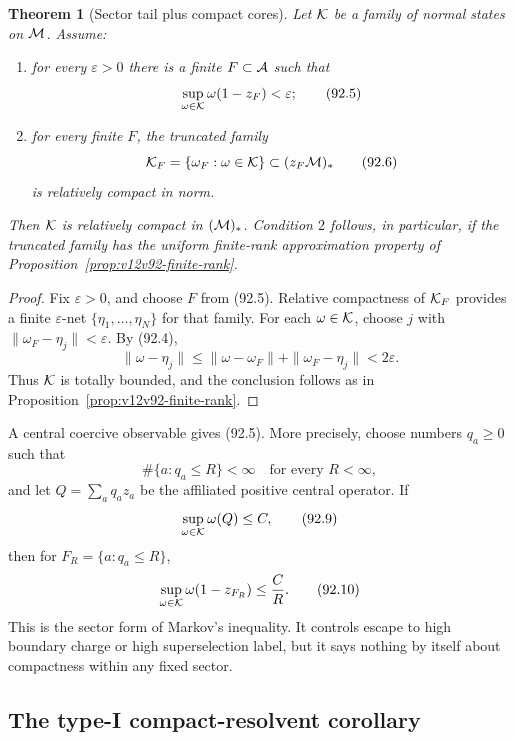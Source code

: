 \documentclass[11pt]{article}
\newtheorem{theorem}{Theorem}[section]
\theoremstyle{remark}
\begin{document}
\begin{theorem}[Sector tail plus compact cores]
\label{thm:v12v92-sector}
Let \({\cal K}\) be a family of normal states on \({\cal M}\).
Assume:

\begin{enumerate}
\item for every \(\varepsilon>0\) there is a finite
\(F\subset{\cal A}\) such that
\[
 \sup_{\omega\in{\cal K}}\omega(1-z_F)<\varepsilon;              \tag{92.5}
\]
\item for every finite \(F\), the truncated family
\[
 {\cal K}_F=\{\omega_F:\omega\in{\cal K}\}
 \subset(z_F{\cal M})_*                                         \tag{92.6}
\]
is relatively compact in norm.
\end{enumerate}

Then \({\cal K}\) is relatively compact in \(({\cal M})_*\).
Condition \(2\) follows, in particular, if the truncated family has
the uniform finite-rank approximation property of
Proposition~\ref{prop:v12v92-finite-rank}.
\end{theorem}

\begin{proof}
Fix \(\varepsilon>0\), and choose \(F\) from (92.5).
Relative compactness of \({\cal K}_F\) provides a finite
\(\varepsilon\)-net \(\{\eta_1,\ldots,\eta_N\}\) for that family.
For each \(\omega\in{\cal K}\), choose \(j\) with
\(\|\omega_F-\eta_j\|<\varepsilon\).  By (92.4),
\[
 \|\omega-\eta_j\|
 \leq\|\omega-\omega_F\|+\|\omega_F-\eta_j\|
 <2\varepsilon.                                                  \tag{92.7}
\]
Thus \({\cal K}\) is totally bounded, and the conclusion follows as
in Proposition~\ref{prop:v12v92-finite-rank}.
\end{proof}

A central coercive observable gives (92.5).  More precisely, choose
numbers \(q_a\geq0\) such that
\[
 \#\{a:q_a\leq R\}<\infty\quad\text{for every }R<\infty,          \tag{92.8}
\]
and let \(Q=\sum_a q_a z_a\) be the affiliated positive central
operator.  If
\[
 \sup_{\omega\in{\cal K}}\omega(Q)\leq C,                         \tag{92.9}
\]
then for \(F_R=\{a:q_a\leq R\}\),
\[
 \sup_{\omega\in{\cal K}}\omega(1-z_{F_R})
 \leq \frac{C}{R}.                                               \tag{92.10}
\]
This is the sector form of Markov's inequality.  It controls escape
to high boundary charge or high superselection label, but it says
nothing by itself about compactness within any fixed sector.

\subsection{The type-I compact-resolvent corollary}
\end{document}

